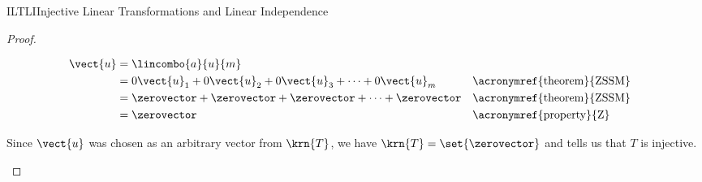 \begin{subsect}{ILTLI}{Injective Linear Transformations and Linear Independence}
\begin{proof}
\begin{para}
%
\begin{align*}
\vect{u}&=\lincombo{a}{u}{m}\\
&=0\vect{u}_1+0\vect{u}_2+0\vect{u}_3+\cdots+0\vect{u}_m&&\text{\acronymref{theorem}{ZSSM}}\\
&=\zerovector+\zerovector+\zerovector+\cdots+\zerovector&&\text{\acronymref{theorem}{ZSSM}}\\
&=\zerovector&&\text{\acronymref{property}{Z}}
\end{align*}
\end{para}
%
\begin{para}Since $\vect{u}$ was chosen as an arbitrary vector from $\krn{T}$, we have $\krn{T}=\set{\zerovector}$ and  tells us that $T$ is injective.\end{para}
%
\end{proof}
%
\end{subsect}
%
